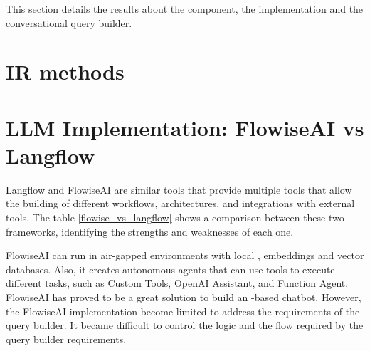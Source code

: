 This section details the results about the {\ir} component, the {\llm} implementation and the conversational query builder.


\section{IR methods}











% 
%
%
% 
% 


\section{LLM Implementation: FlowiseAI vs Langflow}

Langflow and FlowiseAI are similar tools that provide multiple tools that allow the building of different workflows, architectures, and integrations with external tools. The table \ref{flowise_vs_langflow} shows a comparison between these two frameworks, identifying the strengths and weaknesses of each one.

FlowiseAI can run in air-gapped environments with local {\llm}, embeddings and vector databases. Also, it creates autonomous agents that can use tools to execute different tasks, such as Custom Tools, OpenAI Assistant, and Function Agent. FlowiseAI has proved to be a great solution to build an {\llm}-based chatbot. However, the FlowiseAI implementation become limited to address the requirements of the query builder. It became difficult to control the logic and the flow required by the query builder requirements. 

